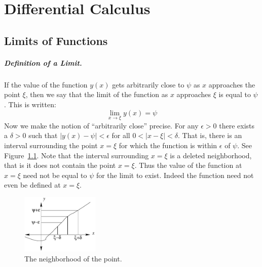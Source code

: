 
\flushbottom




\chapter{Differential Calculus}
\label{chapter_differential}



\section{Limits of Functions}



\paragraph{Definition of a Limit.}
If the value of the function $y(x)$ gets arbitrarily close to $\psi$ as 
$x$ approaches the point $\xi$, then we say that the limit of the function
as $x$ approaches $\xi$ is equal to $\psi$.  This is written:
\[
\lim_{x \to \xi} y(x) = \psi
\]
Now we make the notion of ``arbitrarily close'' precise.  For any $\epsilon > 0$
there exists a $\delta > 0$ such that $|y(x) - \psi| < \epsilon$ for all
$0 < | x - \xi | < \delta$.  That is, there is an interval surrounding the
point $x = \xi$ for which the function is within $\epsilon$ of $\psi$.
See Figure~\ref{limfx}.  Note that the interval surrounding $x = \xi$ is
a deleted neighborhood, that is it does not contain the point $x = \xi$.
Thus the value of the function at $x = \xi$ need not be equal to $\psi$ for 
the limit to exist.  Indeed the function need not even be defined 
at $x = \xi$.


\begin{figure}[h!]
  \begin{center}
    \includegraphics[width=0.33\textwidth]{calculus/differential/limfx}
  \end{center}
  \caption{The neighborhood of the point.}
  \label{limfx}
\end{figure}



